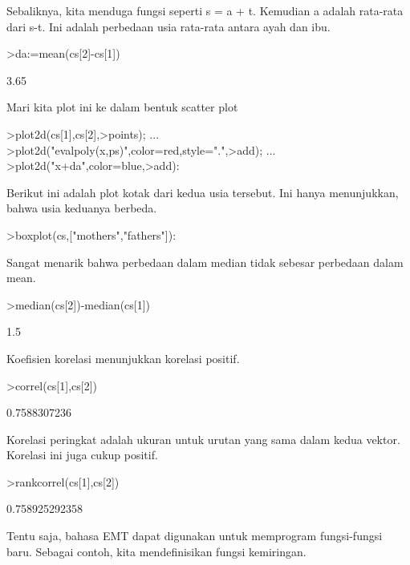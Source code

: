 \documentclass{article}
\begin{document}
\begin{eulernotebook}
\begin{eulercomment}
Sebaliknya, kita menduga fungsi seperti s = a + t. Kemudian a adalah
rata-rata dari s-t. Ini adalah perbedaan usia rata-rata antara ayah
dan ibu.
\end{eulercomment}
\begin{eulerprompt}
>da:=mean(cs[2]-cs[1])
\end{eulerprompt}
\begin{euleroutput}
  3.65
\end{euleroutput}
\begin{eulercomment}
Mari kita plot ini ke dalam bentuk scatter plot
\end{eulercomment}
\begin{eulerprompt}
>plot2d(cs[1],cs[2],>points);  ...
>plot2d("evalpoly(x,ps)",color=red,style=".",>add);  ...
>plot2d("x+da",color=blue,>add):
\end{eulerprompt}
\begin{eulercomment}
Berikut ini adalah plot kotak dari kedua usia tersebut. Ini hanya
menunjukkan, bahwa usia keduanya berbeda.
\end{eulercomment}
\begin{eulerprompt}
>boxplot(cs,["mothers","fathers"]):
\end{eulerprompt}
\begin{eulercomment}
Sangat menarik bahwa perbedaan dalam median tidak sebesar perbedaan
dalam mean.
\end{eulercomment}
\begin{eulerprompt}
>median(cs[2])-median(cs[1])
\end{eulerprompt}
\begin{euleroutput}
  1.5
\end{euleroutput}
\begin{eulercomment}
Koefisien korelasi menunjukkan korelasi positif.
\end{eulercomment}
\begin{eulerprompt}
>correl(cs[1],cs[2])
\end{eulerprompt}
\begin{euleroutput}
  0.7588307236
\end{euleroutput}
\begin{eulercomment}
Korelasi peringkat adalah ukuran untuk urutan yang sama dalam kedua
vektor. Korelasi ini juga cukup positif.
\end{eulercomment}
\begin{eulerprompt}
>rankcorrel(cs[1],cs[2])
\end{eulerprompt}
\begin{euleroutput}
  0.758925292358
\end{euleroutput}
\begin{eulercomment}
Tentu saja, bahasa EMT dapat digunakan untuk memprogram fungsi-fungsi
baru. Sebagai contoh, kita mendefinisikan fungsi kemiringan.


\end{eulercomment}
\end{eulernotebook}
\end{document}

